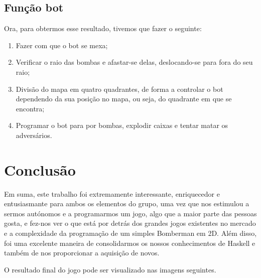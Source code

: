 \documentclass[a4paper]{article}
\begin{document}
\subsection{Função bot}
Ora, para obtermos esse resultado, tivemos que fazer o seguinte:
\begin{enumerate}
\item Fazer com que o bot se mexa;
\item Verificar o raio das bombas e afastar-se delas, deslocando-se para fora do seu raio;
\item Divisão do mapa em quatro quadrantes, de forma a controlar o bot dependendo da sua posição no mapa, ou seja, do quadrante em que se encontra;
\item Programar o bot para por bombas, explodir caixas e tentar matar os adversários.
\end{enumerate}

\section{Conclusão}

Em suma, este trabalho foi extremamente interessante, enriquecedor e entusiasmante para ambos os elementos do grupo, uma vez que nos estimulou a sermos autónomos e a programarmos um jogo, algo que a maior parte das pessoas gosta, e fez-nos ver o que está por detrás dos grandes jogos existentes no mercado e a complexidade da programação de um simples Bomberman em 2D. Além disso, foi uma excelente maneira de consolidarmos os nossos conhecimentos de Haskell e também de nos proporcionar a aquisição de novos.

O resultado final do jogo pode ser visualizado nas imagens seguintes.
\end{document}
